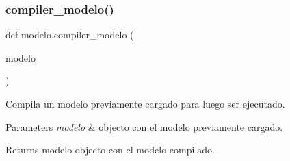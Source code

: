 \subsubsection{\texorpdfstring{compiler\+\_\+modelo()}{compiler\_modelo()}}
{\footnotesize\ttfamily def modelo.\+compiler\+\_\+modelo (\begin{DoxyParamCaption}\item[{}]{modelo }\end{DoxyParamCaption})}



Compila un modelo previamente cargado para luego ser ejecutado. 


\begin{DoxyParams}{Parameters}
{\em modelo} & objecto con el modelo previamente cargado. \\
\hline
\end{DoxyParams}
\begin{DoxyReturn}{Returns}
modelo objecto con el modelo compilado. 
\end{DoxyReturn}
